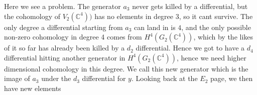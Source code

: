 
Here we see a problem. 
The generator $a_3$ never gets killed by a differential, 
but the cohomology of $V_2(\mathbb{C}^4))$ has no elements in degree $3$, 
so it cant survive. 
The only degree a differential starting from $a_3$ can land in is $4$, 
and the only possible non-zero cohomology in degree 4 comes from $H^4(G_2(\mathbb{C}^4))$, 
which by the likes of it so far has already been killed by a $d_2$ differential. 
Hence we got to have a $d_4$ differential hitting another generator in $H^4(G_2(\mathbb{C}^4))$, 
hence we need higher dimensional cohomology in this degree. 
We call this new generator which is the image of $a_3$ under the $d_3$ differential for $y$. 
Looking back at the $E_2$ page, we then have new elements

